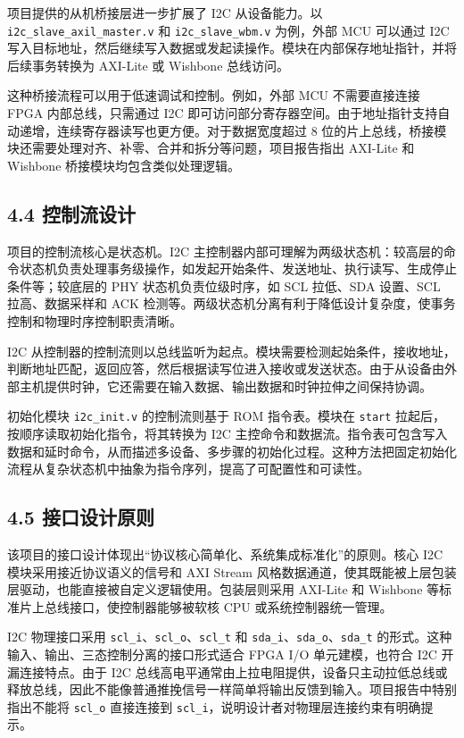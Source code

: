 项目提供的从机桥接层进一步扩展了 I2C 从设备能力。以 \texttt{i2c\_slave\_axil\_master.v} 和 \texttt{i2c\_slave\_wbm.v} 为例，外部 MCU 可以通过 I2C 写入目标地址，然后继续写入数据或发起读操作。模块在内部保存地址指针，并将后续事务转换为 AXI-Lite 或 Wishbone 总线访问。

这种桥接流程可以用于低速调试和控制。例如，外部 MCU 不需要直接连接 FPGA 内部总线，只需通过 I2C 即可访问部分寄存器空间。由于地址指针支持自动递增，连续寄存器读写也更方便。对于数据宽度超过 8 位的片上总线，桥接模块还需要处理对齐、补零、合并和拆分等问题，项目报告指出 AXI-Lite 和 Wishbone 桥接模块均包含类似处理逻辑。

\subsection{4.4 控制流设计}\label{ux63a7ux5236ux6d41ux8bbeux8ba1}

项目的控制流核心是状态机。I2C 主控制器内部可理解为两级状态机：较高层的命令状态机负责处理事务级操作，如发起开始条件、发送地址、执行读写、生成停止条件等；较底层的 PHY 状态机负责位级时序，如 SCL 拉低、SDA 设置、SCL 拉高、数据采样和 ACK 检测等。两级状态机分离有利于降低设计复杂度，使事务控制和物理时序控制职责清晰。

I2C 从控制器的控制流则以总线监听为起点。模块需要检测起始条件，接收地址，判断地址匹配，返回应答，然后根据读写位进入接收或发送状态。由于从设备由外部主机提供时钟，它还需要在输入数据、输出数据和时钟拉伸之间保持协调。

初始化模块 \texttt{i2c\_init.v} 的控制流则基于 ROM 指令表。模块在 \texttt{start} 拉起后，按顺序读取初始化指令，将其转换为 I2C 主控命令和数据流。指令表可包含写入数据和延时命令，从而描述多设备、多步骤的初始化过程。这种方法把固定初始化流程从复杂状态机中抽象为指令序列，提高了可配置性和可读性。

\subsection{4.5 接口设计原则}\label{ux63a5ux53e3ux8bbeux8ba1ux539fux5219}

该项目的接口设计体现出``协议核心简单化、系统集成标准化''的原则。核心 I2C 模块采用接近协议语义的信号和 AXI Stream 风格数据通道，使其既能被上层包装层驱动，也能直接被自定义逻辑使用。包装层则采用 AXI-Lite 和 Wishbone 等标准片上总线接口，使控制器能够被软核 CPU 或系统控制器统一管理。

I2C 物理接口采用 \texttt{scl\_i}、\texttt{scl\_o}、\texttt{scl\_t} 和 \texttt{sda\_i}、\texttt{sda\_o}、\texttt{sda\_t} 的形式。这种输入、输出、三态控制分离的接口形式适合 FPGA I/O 单元建模，也符合 I2C 开漏连接特点。由于 I2C 总线高电平通常由上拉电阻提供，设备只主动拉低总线或释放总线，因此不能像普通推挽信号一样简单将输出反馈到输入。项目报告中特别指出不能将 \texttt{scl\_o} 直接连接到 \texttt{scl\_i}，说明设计者对物理层连接约束有明确提示。

